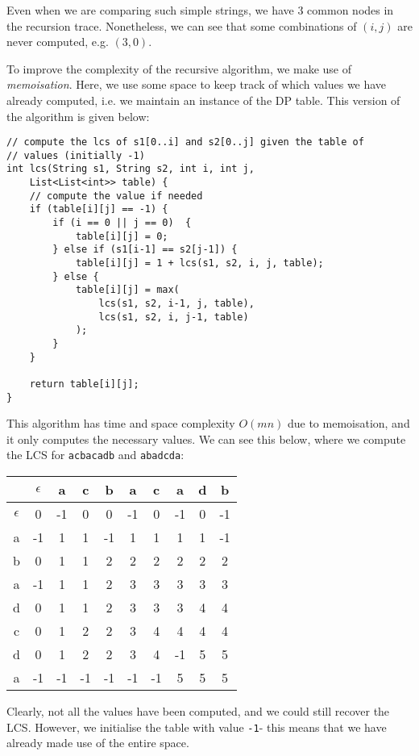 \documentclass[a4paper, openany]{memoir}
\begin{document}
    \noindent Even when we are comparing such simple strings, we have 3 common nodes in the recursion trace. Nonetheless, we can see that some combinations of $(i, j)$ are never computed, e.g. $(3, 0)$. 

    To improve the complexity of the recursive algorithm, we make use of \emph{memoisation}. Here, we use some space to keep track of which values we have already computed, i.e. we maintain an instance of the DP table. This version of the algorithm is given below:
\begin{lstlisting}[language=pseudocode]
// compute the lcs of s1[0..i] and s2[0..j] given the table of 
// values (initially -1)
int lcs(String s1, String s2, int i, int j, 
    List<List<int>> table) {
    // compute the value if needed
    if (table[i][j] == -1) {
        if (i == 0 || j == 0)  {
            table[i][j] = 0;
        } else if (s1[i-1] == s2[j-1]) {
            table[i][j] = 1 + lcs(s1, s2, i, j, table);
        } else {
            table[i][j] = max(
                lcs(s1, s2, i-1, j, table), 
                lcs(s1, s2, i, j-1, table)
            );
        }
    }

    return table[i][j];
}
\end{lstlisting}
    This algorithm has time and space complexity $O(mn)$ due to memoisation, and it only computes the necessary values. We can see this below, where we compute the LCS for \texttt{acbacadb} and \texttt{abadcda}:
    \begin{table}[H]
        \centering
        \begin{tabular}{c|ccccccccc}
            & $\epsilon$ & {\color{blue} a} & c & {\color{blue} b} & {\color{blue} a} & {\color{blue} c} & a & {\color{blue} d} & b \\
            \hline
            $\epsilon$ & 0 & -1 & 0 & 0 & -1 & 0 & -1 & 0 & -1 \\
            a & -1 & 1 & 1 & -1 & 1 & 1 & 1 & 1 & -1 \\
            b & 0 & 1 & 1 & 2 & 2 & 2 & 2 & 2 & 2 \\
            a & -1 & 1 & 1 & 2 & 3 & 3 & 3 & 3 & 3 \\
            d & 0 & 1 & 1 & 2 & 3 & 3 & 3 & 4 & 4 \\
            c & 0 & 1 & 2 & 2 & 3 & 4 & 4 & 4 & 4 \\
            d & 0 & 1 & 2 & 2 & 3 & 4 & -1 & 5 & 5 \\
            a & -1 & -1 & -1 & -1 & -1 & -1 & 5 & 5 & 5
        \end{tabular}
    \end{table}
    \noindent Clearly, not all the values have been computed, and we could still recover the LCS. However, we initialise the table with value \texttt{-1}- this means that we have already made use of the entire space. 
    
\end{document}

